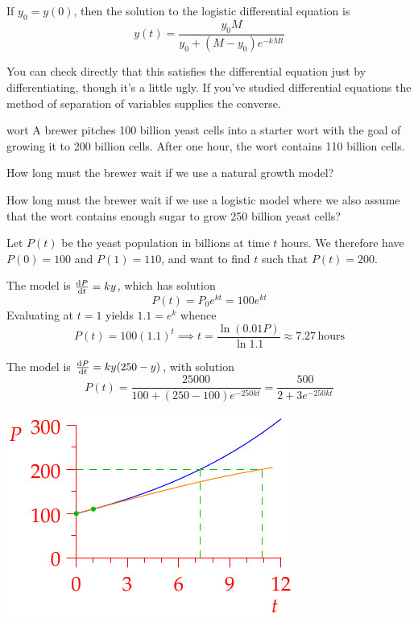 \begin{thm}{}{}
	If $y_0=y(0)$, then the solution to the logistic differential equation is
	\[
		y(t)=\frac{y_0M}{y_0+(M-y_0)e^{-kMt}}
	\]
\end{thm}

You can check directly that this satisfies the differential equation just by differentiating, though it's a little ugly. If you've studied differential equations the method of separation of variables supplies the converse.

\begin{example}{}{wort}
	A brewer pitches 100 billion yeast cells into a starter wort with the goal of growing it to 200 billion cells. After one hour, the wort contains 110 billion cells.
	\begin{enumeratea}
	  \item How long must the brewer wait if we use a natural growth model?
	  \item How long must the brewer wait if we use a logistic model where we also assume that the wort contains enough sugar to grow 250 billion yeast cells?
	\end{enumeratea}
	
	Let $P(t)$ be the yeast population in billions at time $t$ hours. We therefore have $P(0)=100$ and $P(1)=110$, and want to find $t$ such that $P(t)=200$.
	\begin{enumeratea}
	  \begin{minipage}[t]{0.6\linewidth}\vspace{0pt}
	  	\item The model is $\diff[P]{t}=ky$, which has solution
	  	\[
	  		P(t)=P_0e^{kt}=100e^{kt}
	  	\]
	  	Evaluating at $t=1$ yields $1.1=e^k$ whence
	  	\[
	  		P(t)=100(1.1)^t\implies t=\frac{\ln(0.01 P)}{\ln 1.1}\approx 7.27\,\text{hours}
	  	\]
			\item The model is $\diff[P]{t}=ky(250-y)$, with solution
			\[
				P(t)=\frac{25000}{100+(250-100)e^{-250kt}} =\frac{500}{2+3e^{-250kt}}
			\]
	  \end{minipage}
	  \hfill
	  \begin{minipage}[t]{0.39\linewidth}\vspace{0pt}
	  	\flushright\includegraphics{wort}
	  \end{minipage}\smallbreak
	  

\end{enumeratea}
\end{example}
